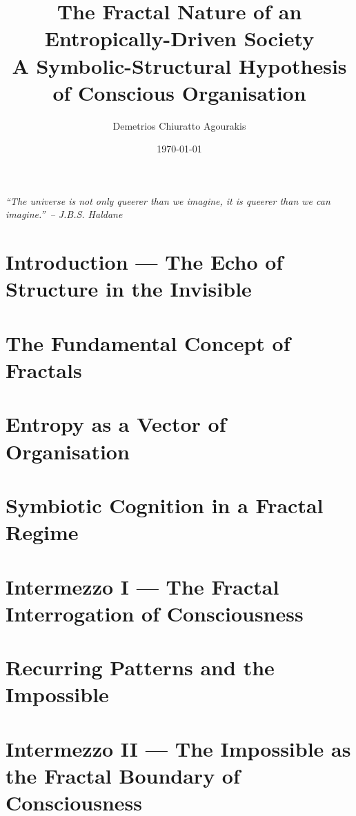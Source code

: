 \documentclass[11pt]{article}
\title{\textbf{The Fractal Nature of an Entropically-Driven Society}\\ \large A Symbolic-Structural Hypothesis of Conscious Organisation}
\author{Demetrios Chiuratto Agourakis}
\date{\today}
\begin{document}
\maketitle
\begin{center}
\textit{\textquotedblleft The universe is not only queerer than we imagine, it is queerer than we can imagine.\textquotedblright\ – J.B.S. Haldane}
\end{center}
\vspace{1em}

\tableofcontents
\newpage

\section{Introduction — The Echo of Structure in the Invisible}


\section{The Fundamental Concept of Fractals}


\section{Entropy as a Vector of Organisation}


\section{Symbiotic Cognition in a Fractal Regime}


\section*{Intermezzo I — The Fractal Interrogation of Consciousness}


\section{Recurring Patterns and the Impossible}


\section*{Intermezzo II — The Impossible as the Fractal Boundary of Consciousness}

\end{document}
